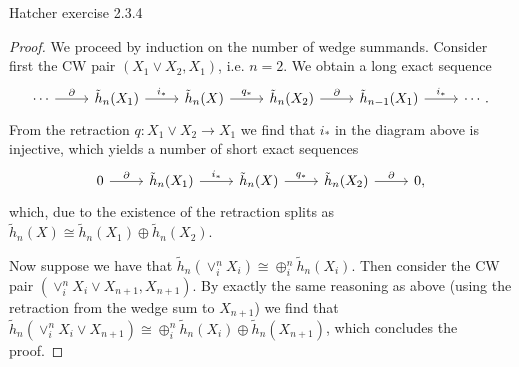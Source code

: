 \documentclass{../../mathnotes}
\begin{document}
\begin{prop}
    Hatcher exercise 2.3.4
\end{prop}
\begin{proof}
    We proceed by induction on the number of wedge summands. Consider first the CW pair $(X_1\vee X_2, X_1)$, i.e. $n=2$.
    We obtain a long exact sequence
    \begin{equation*}
        \begin{tikzcd}
            \cdots\ar{r}{\partial} & \tilde h_n(X_1)\ar{r}{i_*} & \tilde h_n(X)\ar{r}{q_*} & \tilde h_n(X_2)\ar{r}{\partial} & \tilde h_{n-1}(X_1)\ar{r}{i_*} & \cdots.
        \end{tikzcd}
    \end{equation*}
    From the retraction $q:X_1\vee X_2\to X_1$ we find that $i_*$ in the diagram above is injective, which yields
    a number of short exact sequences
    \begin{equation*}
        \begin{tikzcd}
            0\ar{r}{\partial} & \tilde h_n(X_1)\ar{r}{i_*} & \tilde h_n(X)\ar{r}{q_*} & \tilde h_n(X_2)\ar{r}{\partial} & 0,
        \end{tikzcd}
    \end{equation*}
    which, due to the existence of the retraction splits as $\tilde h_n(X)\cong \tilde h_n(X_1)\oplus \tilde h_n(X_2)$.
    
    Now suppose we have that $\tilde h_n(\vee_i^n X_i)\cong \oplus_i^n \tilde h_n(X_i)$. Then consider the CW pair
    $(\vee_i^n X_i\vee X_{n+1}, X_{n+1})$. By exactly the same reasoning as above (using the retraction from the wedge
    sum to $X_{n+1}$) we find that $\tilde h_n(\vee_i^n X_i\vee X_{n+1})\cong \oplus_i^n\tilde h_n(X_i)\oplus \tilde h_n(X_{n+1})$,
    which concludes the proof.
\end{proof}
\end{document}
